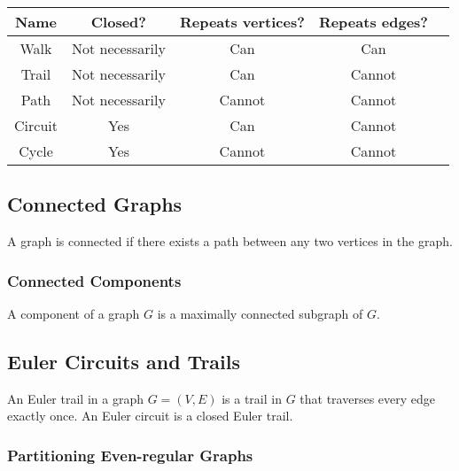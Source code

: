 \begin{center}
    \begin{tabular} {| c | c | c | c | c |}
        \hline
        Name & Closed? & Repeats vertices? & Repeats edges? \\
        \hline \hline
        Walk        & Not necessarily & Can    & Can    \\ \hline
        Trail       & Not necessarily & Can    & Cannot \\ \hline
        Path        & Not necessarily & Cannot & Cannot \\ \hline
        Circuit     & Yes             & Can    & Cannot \\ \hline
        Cycle       & Yes             & Cannot & Cannot \\ \hline
    \end{tabular}
\end{center}

\subsection{Connected Graphs}

A graph is connected if there exists a path between any two vertices 
in the graph.

\subsubsection{Connected Components}

A component of a graph $G$ is a maximally connected subgraph of $G$.

\subsection{Euler Circuits and Trails}

An Euler trail in a graph $G = (V, E)$ is a trail in $G$ that traverses every edge
exactly once. An Euler circuit is a closed Euler trail.

\subsubsection{Partitioning Even-regular Graphs} \label{eulerpart}

